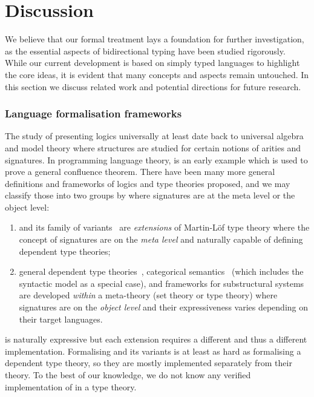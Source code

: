 
\section{Discussion} \label{sec:future}
We believe that our formal treatment lays a foundation for further investigation, as the essential aspects of bidirectional typing have been studied rigorously. 
While our current development is based on simply typed languages to highlight the core ideas, it is evident that many concepts and aspects remain untouched.
In this section we discuss related work and potential directions for future research.
\subsubsection{Language formalisation frameworks}

The study of presenting logics universally at least date back to universal algebra and model theory where structures are studied for certain notions of arities and signatures.
In programming language theory,  is an early example which is used to prove a general confluence theorem.
There have been many more general definitions and frameworks of logics and type theories proposed, and we may classify those into two groups by where signatures are at the meta level or the object level:
\begin{enumerate}
\item {} and its family of variants~\cite{Harper2007,Assaf2016,Felicissimo2023} are \emph{extensions} of Martin-L\"of type theory where the concept of signatures are on the \emph{meta level} and naturally capable of defining dependent type theories;
\item general dependent type theories~\cite{Bauer2020,Haselwarter2021,Bauer2022a,Uemura2021}, categorical semantics~\cite{Fiore1999,Tanaka2006,Tanaka2006a,Fiore2010,Hamana2011,Fiore2013,Arkor2020,Fiore2022} (which includes the syntactic model as a special case), and frameworks for substructural systems~\cite{Tanaka2006,Tanaka2006a,Wood2022} are developed \emph{within} a meta-theory (set theory or type theory) where signatures are on the \emph{object level} and their expressiveness varies depending on their target languages.
\end{enumerate}

\LF is naturally expressive but each extension requires a different \LF and thus a different implementation.
Formalising \LF and its variants is at least as hard as formalising a dependent type theory, so they are mostly implemented separately from their theory.
To the best of our knowledge, we do not know any verified implementation of \LF in a type theory.

